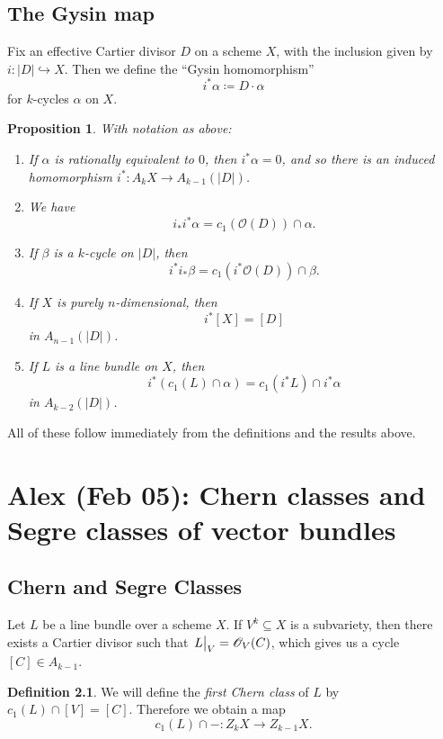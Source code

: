 \documentclass[leqno, openany]{memoir}
\newtheorem{prop}[thm]{Proposition}
\theoremstyle{definition}
\newtheorem{defn}[thm]{Definition}
\theoremstyle{remark}
\theoremstyle{plain}
\theoremstyle{definition}
\theoremstyle{remark}
\newcommand{\msc}[1]{\mathscr{#1}}
\begin{document}
\section{The Gysin map}
Fix an effective Cartier divisor $D$ on a scheme $X$, with the inclusion given by $i\colon |D| \hookrightarrow X$. Then we define the ``Gysin homomorphism'' \[ i^* \alpha \coloneqq D \cdot \alpha \] for $k$-cycles $\alpha$ on $X$.

\begin{prop}
With notation as above:
\begin{enumerate}[label=(\alph*)]
\item If $\alpha$ is rationally equivalent to $0$, then $i^* \alpha = 0$, and so there is an induced homomorphism $i^*\colon A_k X \to A_{k-1} (|D|)$.
\item We have \[ i_* i^* \alpha = c_1(\msc{O}(D)) \cap \alpha . \]
\item If $\beta$ is a $k$-cycle on $|D|$, then \[ i^* i_* \beta = c_1(i^* \msc{O}(D)) \cap \beta . \]
\item If $X$ is purely $n$-dimensional, then \[ i^* [X] = [D] \] in $A_{n-1} (|D|)$.
\item If $L$ is a line bundle on $X$, then \[ i^* (c_1(L) \cap \alpha) = c_1(i^* L) \cap i^* \alpha \] in $A_{k-2} (|D|)$.
\end{enumerate}
\end{prop}
All of these follow immediately from the definitions and the results above.

\chapter{Alex (Feb 05): Chern classes and Segre classes of vector bundles}%
\label{cha:alex_feb_05_chern_classes_and_segre_classes_of_vector_bundles}

\section{Chern and Segre Classes}%
\label{sec:chern_classes}

Let $L$ be a line bundle over a scheme $X$. If $V^k \subseteq X$ is a subvariety, then there exists a Cartier divisor such that $\eval{L}_V = \msc{O}_V(C)$, which gives us a cycle $[C] \in A_{k-1}$. 

\begin{defn}
    We will define the \textit{first Chern class} of $L$ by $c_1(L) \cap [V] = [C]$. Therefore we obtain a map
    \[ c_1(L) \cap - \colon Z_k X \to Z_{k-1} X. \]
\end{defn}
\end{document}
